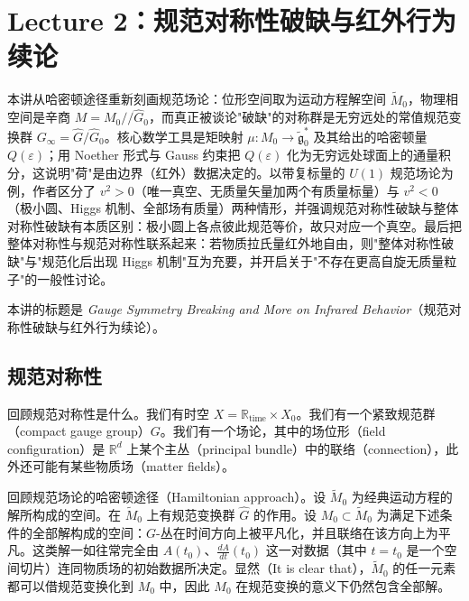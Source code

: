 \section{Lecture 2：规范对称性破缺与红外行为续论}

\begin{keytakeaways}
本讲从哈密顿途径重新刻画规范场论：位形空间取为运动方程解空间 $\widetilde{M}_0$，物理相空间是辛商 $M=M_0/\!/\widehat{G}_0$，而真正被谈论"破缺"的对称群是无穷远处的常值规范变换群 $G_\infty=\widehat{G}/\widehat{G}_0$。核心数学工具是矩映射 $\mu:M_0\to\widetilde{\mathfrak g}_0^*$ 及其给出的哈密顿量 $Q(\varepsilon)$；用 Noether 形式与 Gauss 约束把 $Q(\varepsilon)$ 化为无穷远处球面上的通量积分，这说明"荷"是由边界（红外）数据决定的。以带复标量的 $U(1)$ 规范场论为例，作者区分了 $v^2>0$（唯一真空、无质量矢量加两个有质量标量）与 $v^2<0$（极小圆、Higgs 机制、全部场有质量）两种情形，并强调规范对称性破缺与整体对称性破缺有本质区别：极小圆上各点彼此规范等价，故只对应一个真空。最后把整体对称性与规范对称性联系起来：若物质拉氏量红外地自由，则"整体对称性破缺"与"规范化后出现 Higgs 机制"互为充要，并开启关于"不存在更高自旋无质量粒子"的一般性讨论。
\end{keytakeaways}

本讲的标题是 \emph{Gauge Symmetry Breaking and More on Infrared Behavior}（规范对称性破缺与红外行为续论）。

\subsection{规范对称性}

回顾规范对称性是什么。我们有时空 $X=\mathbb{R}_{\text{time}}\times X_0$。我们有一个紧致规范群（compact gauge group）$G$。我们有一个场论，其中的场位形（field configuration）是 $\mathbb{R}^d$ 上某个主丛（principal bundle）中的联络（connection），此外还可能有某些物质场（matter fields）。

回顾规范场论的哈密顿途径（Hamiltonian approach）。设 $\widetilde{M}_0$ 为经典运动方程的解所构成的空间。在 $\widetilde{M}_0$ 上有规范变换群 $\widehat{G}$ 的作用。设 $M_0\subset\widetilde{M}_0$ 为满足下述条件的全部解构成的空间：$G$-丛在时间方向上被平凡化，并且联络在该方向上为平凡。这类解一如往常完全由 $A(t_0)$、$\frac{dA}{dt}(t_0)$ 这一对数据（其中 $t=t_0$ 是一个空间切片）连同物质场的初始数据所决定。显然（It is clear that），$\widetilde{M}_0$ 的任一元素都可以借规范变换化到 $M_0$ 中，因此 $M_0$ 在规范变换的意义下仍然包含全部解。

